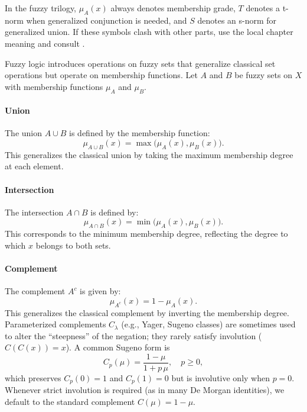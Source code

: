 \begin{tcolorbox}[summarybox, title={Notation handoff}]
In the fuzzy trilogy, \(\mu_A(x)\) always denotes membership grade, \(T\) denotes a t\hyp{}norm when generalized conjunction is needed, and \(S\) denotes an s\hyp{}norm for generalized union. If these symbols clash with other parts, use the local chapter meaning and consult .
\end{tcolorbox}

Fuzzy logic introduces operations on fuzzy sets that generalize classical set operations but operate on membership functions. Let \( A \) and \( B \) be fuzzy sets on \( X \) with membership functions \(\mu_A\) and \(\mu_B\).

\paragraph{Union} The union \( A \cup B \) is defined by the membership function:
\begin{equation}
    \mu_{A \cup B}(x) = \max\big(\mu_A(x), \mu_B(x)\big).
    \label{eq:fuzzy_union}
\end{equation}
This generalizes the classical union by taking the maximum membership degree at each element.

\paragraph{Intersection} The intersection \( A \cap B \) is defined by:
\begin{equation}
    \mu_{A \cap B}(x) = \min\big(\mu_A(x), \mu_B(x)\big).
    \label{eq:fuzzy_intersection}
\end{equation}
This corresponds to the minimum membership degree, reflecting the degree to which \( x \) belongs to both sets.

\paragraph{Complement} The complement \( A^c \) is given by:
\begin{equation}
    \mu_{A^c}(x) = 1 - \mu_A(x).
    \label{eq:fuzzy_complement}
\end{equation}
This generalizes the classical complement by inverting the membership degree.
Parameterized complements $C_\lambda$ (e.g., Yager, Sugeno classes) are sometimes used to alter the ``steepness'' of the negation; they rarely satisfy involution ($C(C(x)) = x$). A common Sugeno form is
\[
    C_p(\mu) = \frac{1-\mu}{1+p\,\mu}, \quad p \ge 0,
\]
which preserves $C_p(0)=1$ and $C_p(1)=0$ but is involutive only when $p=0$. Whenever strict involution is required (as in many De Morgan identities), we default to the standard complement $C(\mu)=1-\mu$.

